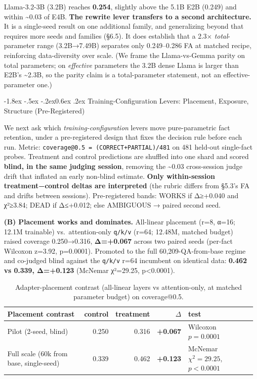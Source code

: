 \documentclass[10pt,twocolumn]{article}
\makeatletter
\renewcommand\subsection{\@startsection{subsection}{2}{\z@}%
  {-1.8ex \@plus -.5ex \@minus -.2ex}{0.6ex \@plus .2ex}%
  {\normalfont\normalsize\bfseries}}
\makeatother
\begin{document}
Llama-3.2-3B (3.2B) reaches \textbf{0.254}, slightly above the 5.1B E2B (0.249) and within \textasciitilde0.03 of E4B. \textbf{The rewrite lever transfers to a second architecture.} It is a single-seed result on one additional family, and generalizing beyond that requires more seeds and families (§6.5). It does establish that a 2.3× \emph{total}-parameter range (3.2B→7.49B) separates only 0.249--0.286 FA at matched recipe, reinforcing data-diversity over scale. (We frame the Llama-vs-Gemma parity on total parameters; on \emph{effective} parameters the 3.2B dense Llama is larger than E2B's \textasciitilde2.3B, so the parity claim is a total-parameter statement, not an effective-parameter one.)

\hypertarget{training-configuration-levers-placement-exposure-structure-pre-registered}{%
\subsection{Training-Configuration Levers: Placement, Exposure, Structure (Pre-Registered)}\label{training-configuration-levers-placement-exposure-structure-pre-registered}}

We next ask which \emph{training-configuration} levers move pure-parametric fact retention, under a pre-registered design that fixes the decision rule before each run. Metric: \texttt{coverage@0.5\ =\ (CORRECT+PARTIAL)/481} on 481 held-out single-fact probes. Treatment and control predictions are shuffled into one shard and scored \textbf{blind, in the same judging session}, removing the \textasciitilde0.03 cross-session judge drift that inflated an early non-blind estimate. \textbf{Only within-session treatment−control deltas are interpreted} (the rubric differs from §5.3's FA and drifts between sessions). Pre-registered bands: WORKS if Δ≥+0.040 and χ²≥3.84; DEAD if Δ≤+0.012; else AMBIGUOUS → paired second seed.

\textbf{(B) Placement works and dominates.} All-linear placement (r=8, α=16; 12.1M trainable) vs.~attention-only \texttt{q/k/v} (r=64; 12.48M, matched budget) raised coverage 0.250→0.316, \textbf{Δ=+0.067} across two paired seeds (per-fact Wilcoxon z=3.92, p=0.0001). Promoted to the full 60,209-QA-from-base regime and co-judged blind against the \texttt{q/k/v} r=64 incumbent on identical data: \textbf{0.462 vs 0.339, Δ=+0.123} (McNemar χ²=29.25, p\textless0.0001).

\begin{table}[!t]
\centering
\caption{Adapter-placement contrast (all-linear layers vs attention-only, at matched parameter budget) on coverage@0.5.}
\label{tab:placement}
\small
\begin{tabular}{@{}l r r r l@{}}
\toprule
Placement contrast & control & treatment & $\Delta$ & test \\
\midrule
Pilot (2-seed, blind) & 0.250 & 0.316 & \textbf{+0.067} & Wilcoxon $p{=}0.0001$ \\
Full scale (60k from base, single-seed) & 0.339 & 0.462 & \textbf{+0.123} & McNemar $\chi^2{=}29.25$, $p{<}0.0001$ \\
\bottomrule
\end{tabular}
\end{table}
\end{document}
